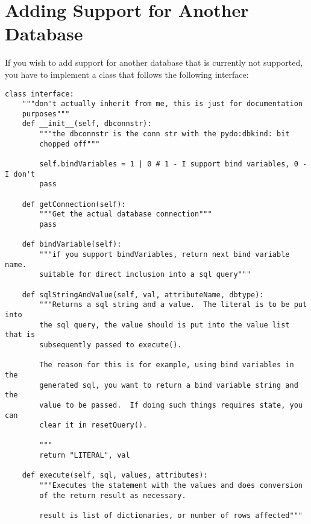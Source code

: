 \documentclass[titlepage]{manual}
\begin{document}
\chapter{Adding Support for Another Database}
If you wish to add support for another database that is currently not
supported, you have to implement a class that follows the following
interface:
\begin{verbatim}
class interface:
    """don't actually inherit from me, this is just for documentation
    purposes"""
    def __init__(self, dbconnstr):
        """the dbconnstr is the conn str with the pydo:dbkind: bit
        chopped off"""

        self.bindVariables = 1 | 0 # 1 - I support bind variables, 0 - I don't
        pass

    def getConnection(self):
        """Get the actual database connection"""
        pass
    
    def bindVariable(self):
        """if you support bindVariables, return next bind variable name.
        suitable for direct inclusion into a sql query"""
        
    def sqlStringAndValue(self, val, attributeName, dbtype):
        """Returns a sql string and a value.  The literal is to be put into
        the sql query, the value should is put into the value list that is
        subsequently passed to execute().

        The reason for this is for example, using bind variables in the
        generated sql, you want to return a bind variable string and the
        value to be passed.  If doing such things requires state, you can
        clear it in resetQuery().

        """
        return "LITERAL", val

    def execute(self, sql, values, attributes):
        """Executes the statement with the values and does conversion
        of the return result as necessary.

        result is list of dictionaries, or number of rows affected"""
\end{verbatim}
\end{document}
